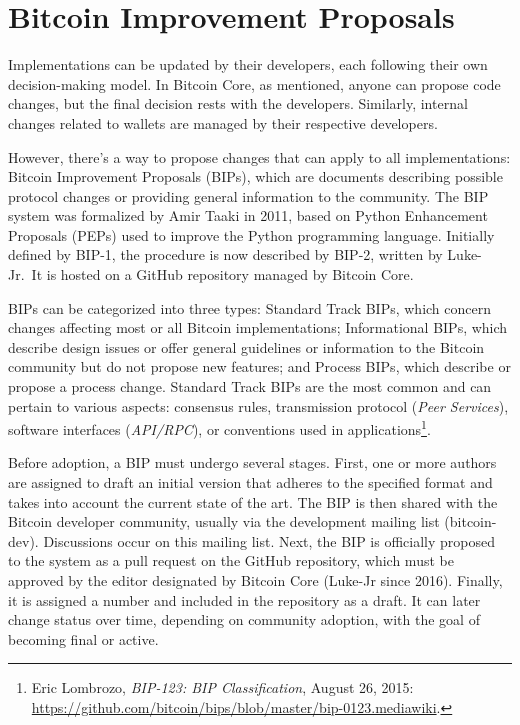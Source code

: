 \documentclass[
  a5paper,
  smalldemyvopaper,10pt,twoside,onecolumn,openright,extrafontsizes,hidelinks]{memoir}
\begin{document}
\section*{Bitcoin Improvement
Proposals}\label{bitcoin-improvement-proposals}


Implementations can be updated by their developers, each following their
own decision-making model. In Bitcoin Core, as mentioned, anyone can
propose code changes, but the final decision rests with the developers.
Similarly, internal changes related to wallets are managed by their
respective developers.

However, there's a way to propose changes that can apply to all
implementations: Bitcoin Improvement Proposals (BIPs), which are
documents describing possible protocol changes or providing general
information to the community. The BIP system was formalized by Amir
Taaki in 2011, based on Python Enhancement Proposals (PEPs) used to
improve the Python programming language. Initially defined by BIP-1, the
procedure is now described by BIP-2, written by Luke-Jr.~It is hosted on
a GitHub repository managed by Bitcoin Core.

BIPs can be categorized into three types: Standard Track BIPs, which
concern changes affecting most or all Bitcoin implementations;
Informational BIPs, which describe design issues or offer general
guidelines or information to the Bitcoin community but do not propose
new features; and Process BIPs, which describe or propose a process
change. Standard Track BIPs are the most common and can pertain to
various aspects: consensus rules, transmission protocol (\emph{Peer
Services}), software interfaces (\emph{API/RPC}), or conventions used in
applications\footnote{Eric Lombrozo, \emph{BIP-123: BIP Classification},
  August 26, 2015:
  \url{https://github.com/bitcoin/bips/blob/master/bip-0123.mediawiki}.}.

Before adoption, a BIP must undergo several stages. First, one or more
authors are assigned to draft an initial version that adheres to the
specified format and takes into account the current state of the art.
The BIP is then shared with the Bitcoin developer community, usually via
the development mailing list (bitcoin-dev). Discussions occur on this
mailing list. Next, the BIP is officially proposed to the system as a
pull request on the GitHub repository, which must be approved by the
editor designated by Bitcoin Core (Luke-Jr since 2016). Finally, it is
assigned a number and included in the repository as a draft. It can
later change status over time, depending on community adoption, with the
goal of becoming final or active.
\end{document}
